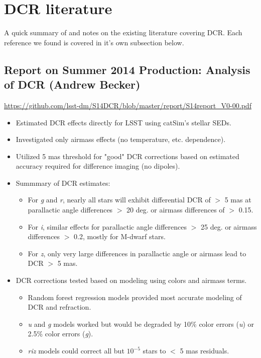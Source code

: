 \documentclass[]{article}
\begin{document}
\section{DCR literature}
A quick summary of and notes on the existing literature covering DCR. Each reference we found is covered in it's own subsection below.

\subsection{Report on Summer 2014 Production: Analysis of DCR (Andrew Becker)}

\url{https://github.com/lsst-dm/S14DCR/blob/master/report/S14report_V0-00.pdf}

\begin{itemize}
	\item Estimated DCR effects directly for LSST using catSim's stellar
	SEDs.
	\item Investigated only airmass effects (no temperature,
          etc. dependence).
	\item Utilized 5 mas threshold for "good" DCR corrections
          based on estimated accuracy required for difference imaging
          (no dipoles).
	\item Summmary of DCR estimates:
	
	\begin{itemize}
		
		\item For \textit{g} and \textit{r}, nearly all stars
                  will exhibit differential DCR of $>$ 5 mas at
                  parallactic angle differences $>$ 20 deg. or airmass
                  differences of $>$ 0.15.
		\item For \textit{i}, similar effects for parallactic
                  angle differences $>$ 25 deg. or airmass differences
                  $>$ 0.2, mostly for M-dwarf stars.
		\item For \textit{z}, only very large differences in
                  parallactic angle or airmass lead to DCR $>$ 5 mas.
	\end{itemize}
	\item DCR corrections tested based on modeling using colors and airmass terms.
	\begin{itemize}
		\item Random forest regression models provided most
                  accurate modeling of DCR and refraction.
		\item \textit{u} and \textit{g} models worked but
                  would be degraded by 10\% color errors (\textit{u})
                  or 2.5\% color errors (\textit{g}).
		\item \textit{riz} models could correct all but
                  $10^{-5}$ stars to $<$ 5 mas residuals.
	\end{itemize}
\end{itemize}
\end{document}
